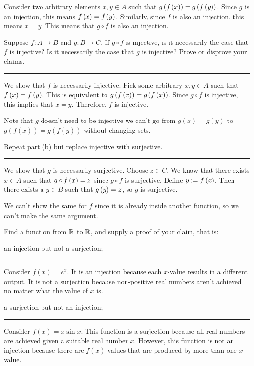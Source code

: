 \documentclass{article}
\begin{document}
Consider two arbitrary elements $x, y \in A$ such that $g \left (f \left (x \right) \right) = g \left (f \left (y \right) \right)$.
Since $g$ is an injection, this means $f \left (x \right) = f \left (y \right)$.
Similarly, since $f$ is also an injection, this means $x = y$.
This means that $g \circ f$ is also an injection.

\subproblema{}
Suppose $f:A\to B$ and $g:B\to C$.
If $g\circ f$ is injective, is it necessarily the case that $f$ is injective?
Is it necessarily the case that $g$ is injective?
Prove or disprove your claims.

\hrule

We show that $f$ is necessarily injective.
Pick some arbitrary $x, y \in A$ such that $f \left (x \right) = f \left (y \right)$.
This is equivalent to $g \left (f \left (x \right) \right) = g \left (f \left (x \right) \right)$.
Since $g \circ f$ is injective, this implies that $x= y$.
Therefore, $f$ is injective.

Note that $g$ doesn't need to be injective we can't go from $g(x) = g(y)$ to $g(f(x)) = g(f(y))$ without changing sets.

\subproblema{}

Repeat part (b) but replace injective with surjective.
\hrule

We show that $g$ is necessarily surjective.
Choose $z \in C$.
We know that there exists $x \in A$ such that $g \circ f \left (x \right) = z$ since $g \circ f$ is surjective.
Define $y := f \left (x \right)$.
Then there exists a $y \in B$ such that $g \left (y \right) = z$, so $g$ is surjective.

We can't show the same for $f$ since it is already inside another function, so we can't make the same argument.

\problem{}

Find a function from $\mathbb R$ to $\mathbb R$, and supply a proof of your claim, that is:

\subproblema{}

an injection but not a surjection;

\hrule

Consider $f(x) = e^x$.
It is an injection because each $x$-value results in a different output.
It is not a surjection because non-positive real numbers aren't achieved no matter what the value of $x$ is.

\subproblema{}

a surjection but not an injection;

\hrule

Consider $f(x) = x \sin x$.
This function is a surjection because all real numbers are achieved given a suitable real number $x$.
However, this function is not an injection because there are $f(x)$-values that are produced by more than one $x$-value.
\end{document}
